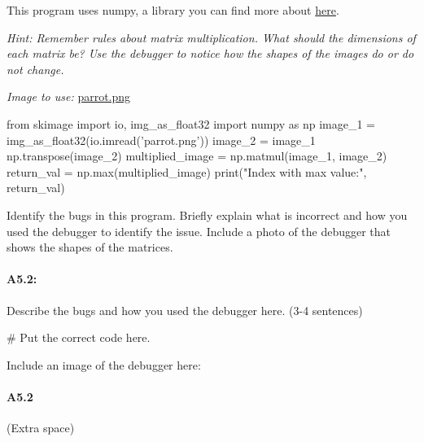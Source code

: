 \documentclass[11pt]{article}
\begin{document}
This program uses numpy, a library you can find more about \href{https://numpy.org/doc/stable/}{here}.

\emph{Hint: Remember rules about matrix multiplication. What should the dimensions of each matrix be? Use the debugger to notice how the shapes of the images do or do not change.}

\emph{Image to use:} \href{parrot.png}{parrot.png}

\begin{python}
from skimage import io, img_as_float32
import numpy as np
image_1 = img_as_float32(io.imread('parrot.png'))
image_2 = image_1
np.transpose(image_2)
multiplied_image = np.matmul(image_1, image_2)
return_val = np.max(multiplied_image)
print("Index with max value:", return_val)
\end{python}
Identify the bugs in this program. Briefly explain what is incorrect and how you used the debugger to identify the issue. Include a photo of the debugger that shows the shapes of the matrices.


\paragraph{A5.2: } Describe the bugs and how you used the debugger here. (3-4 sentences)
\begin{python}
# Put the correct code here.
\end{python}

Include an image of the debugger here:

\pagebreak
\paragraph{A5.2} (Extra space)
\end{document}
